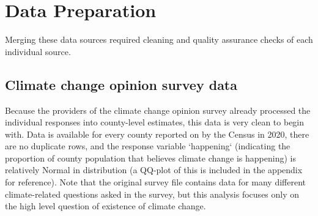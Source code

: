 \documentclass{article}
\begin{document}
\section{Data Preparation}

Merging these data sources required cleaning and quality
assurance checks of each individual source.

\subsection{Climate change opinion survey data}
Because the providers of the climate change opinion survey already processed
the individual responses into county-level estimates, this data is very clean
to begin with. Data is available for every county reported on by the Census
in 2020, there are no duplicate rows, and the response variable `happening`
(indicating the proportion of county population that believes climate change
is happening) is relatively Normal in distribution (a QQ-plot of this is included in the appendix for reference). Note that the original
survey file contains data for many different climate-related questions asked
in the survey, but this analysis focuses only on the high level
question of existence of climate change.
\end{document}
